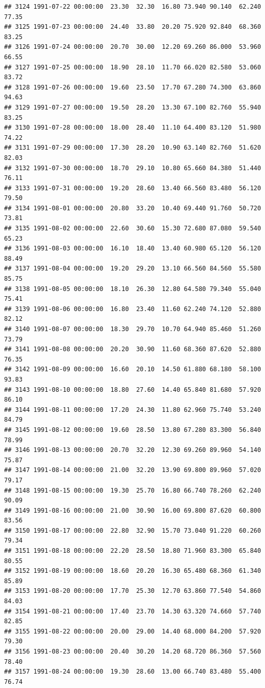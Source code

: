 \documentclass{article}\usepackage{graphicx, color}
\makeatletter
\newenvironment{kframe}{%
 \def\at@end@of@kframe{}%
 \ifinner\ifhmode%
  \def\at@end@of@kframe{\end{minipage}}%
  \begin{minipage}{\columnwidth}%
 \fi\fi%
 \def\FrameCommand##1{\hskip\@totalleftmargin \hskip-\fboxsep
 \colorbox{shadecolor}{##1}\hskip-\fboxsep
     \hskip-\linewidth \hskip-\@totalleftmargin \hskip\columnwidth}%
 \MakeFramed {\advance\hsize-\width
   \@totalleftmargin\z@ \linewidth\hsize
   \@setminipage}}%
 {\par\unskip\endMakeFramed%
 \at@end@of@kframe}
\newenvironment{knitrout}{}{} %
\makeatother
\begin{document}
\begin{knitrout}
\begin{kframe}
\begin{verbatim}
## 3124 1991-07-22 00:00:00  23.30  32.30  16.80 73.940 90.140  62.240  77.35
## 3125 1991-07-23 00:00:00  24.40  33.80  20.20 75.920 92.840  68.360  83.25
## 3126 1991-07-24 00:00:00  20.70  30.00  12.20 69.260 86.000  53.960  66.55
## 3127 1991-07-25 00:00:00  18.90  28.10  11.70 66.020 82.580  53.060  83.72
## 3128 1991-07-26 00:00:00  19.60  23.50  17.70 67.280 74.300  63.860  94.63
## 3129 1991-07-27 00:00:00  19.50  28.20  13.30 67.100 82.760  55.940  83.25
## 3130 1991-07-28 00:00:00  18.00  28.40  11.10 64.400 83.120  51.980  74.22
## 3131 1991-07-29 00:00:00  17.30  28.20  10.90 63.140 82.760  51.620  82.03
## 3132 1991-07-30 00:00:00  18.70  29.10  10.80 65.660 84.380  51.440  76.11
## 3133 1991-07-31 00:00:00  19.20  28.60  13.40 66.560 83.480  56.120  79.50
## 3134 1991-08-01 00:00:00  20.80  33.20  10.40 69.440 91.760  50.720  73.81
## 3135 1991-08-02 00:00:00  22.60  30.60  15.30 72.680 87.080  59.540  65.23
## 3136 1991-08-03 00:00:00  16.10  18.40  13.40 60.980 65.120  56.120  88.49
## 3137 1991-08-04 00:00:00  19.20  29.20  13.10 66.560 84.560  55.580  85.75
## 3138 1991-08-05 00:00:00  18.10  26.30  12.80 64.580 79.340  55.040  75.41
## 3139 1991-08-06 00:00:00  16.80  23.40  11.60 62.240 74.120  52.880  82.12
## 3140 1991-08-07 00:00:00  18.30  29.70  10.70 64.940 85.460  51.260  73.79
## 3141 1991-08-08 00:00:00  20.20  30.90  11.60 68.360 87.620  52.880  76.35
## 3142 1991-08-09 00:00:00  16.60  20.10  14.50 61.880 68.180  58.100  93.83
## 3143 1991-08-10 00:00:00  18.80  27.60  14.40 65.840 81.680  57.920  86.10
## 3144 1991-08-11 00:00:00  17.20  24.30  11.80 62.960 75.740  53.240  84.79
## 3145 1991-08-12 00:00:00  19.60  28.50  13.80 67.280 83.300  56.840  78.99
## 3146 1991-08-13 00:00:00  20.70  32.20  12.30 69.260 89.960  54.140  75.87
## 3147 1991-08-14 00:00:00  21.00  32.20  13.90 69.800 89.960  57.020  79.17
## 3148 1991-08-15 00:00:00  19.30  25.70  16.80 66.740 78.260  62.240  90.09
## 3149 1991-08-16 00:00:00  21.00  30.90  16.00 69.800 87.620  60.800  83.56
## 3150 1991-08-17 00:00:00  22.80  32.90  15.70 73.040 91.220  60.260  79.34
## 3151 1991-08-18 00:00:00  22.20  28.50  18.80 71.960 83.300  65.840  80.55
## 3152 1991-08-19 00:00:00  18.60  20.20  16.30 65.480 68.360  61.340  85.89
## 3153 1991-08-20 00:00:00  17.70  25.30  12.70 63.860 77.540  54.860  84.03
## 3154 1991-08-21 00:00:00  17.40  23.70  14.30 63.320 74.660  57.740  82.85
## 3155 1991-08-22 00:00:00  20.00  29.00  14.40 68.000 84.200  57.920  79.30
## 3156 1991-08-23 00:00:00  20.40  30.20  14.20 68.720 86.360  57.560  78.40
## 3157 1991-08-24 00:00:00  19.30  28.60  13.00 66.740 83.480  55.400  76.74

\end{verbatim}
\end{kframe}
\end{knitrout}
\end{document}

